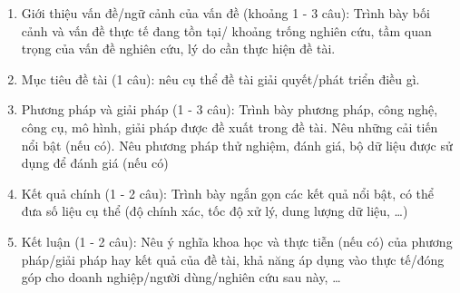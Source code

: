 \begin{enumerate}
    \item Giới thiệu vấn đề/ngữ cảnh của vấn đề (khoảng 1 - 3 câu): Trình bày bối cảnh và vấn đề thực tế đang tồn tại/ khoảng trống nghiên cứu, tầm quan trọng của vấn đề nghiên cứu, lý do cần thực hiện đề tài.
    \item Mục tiêu đề tài (1 câu): nêu cụ thể đề tài giải quyết/phát triển điều gì.
    \item Phương pháp và giải pháp (1 - 3 câu): Trình bày phương pháp, công nghệ, công cụ, mô hình, giải pháp được đề xuất trong đề tài. Nêu những cải tiến nổi bật (nếu có). Nêu phương pháp thử nghiệm, đánh giá, bộ dữ liệu được sử dụng để đánh giá (nếu có)
    \item Kết quả chính (1 - 2 câu): Trình bày ngắn gọn các kết quả nổi bật, có thể đưa số liệu cụ thể (độ chính xác, tốc độ xử lý, dung lượng dữ liệu, \ldots)
    \item Kết luận (1 - 2 câu): Nêu ý nghĩa khoa học và thực tiễn (nếu có) của phương pháp/giải pháp hay kết quả của đề tài, khả năng áp dụng vào thực tế/đóng góp cho doanh nghiệp/người dùng/nghiên cứu sau này, \ldots
\end{enumerate}